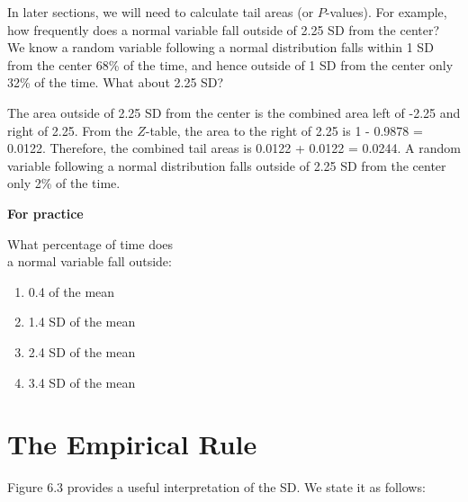 \documentclass[11pt]{book}\usepackage[]{graphicx}\usepackage[]{color}
\begin{document}
In later sections, we will need to calculate tail areas (or $P$-values).  For example, how frequently does a normal variable fall outside of 2.25 SD from the center?  We know a random variable following a normal distribution falls within 1 SD from the center 68\% of the time, and hence outside of 1 SD from the center only 32\% of the time.  What about 2.25 SD?

The area outside of 2.25 SD from the center is the combined area left of -2.25 and right of 2.25.  From the $Z$-table, the area to the right of 2.25 is 1 - 0.9878 = 0.0122.  Therefore, the combined tail areas is 0.0122 + 0.0122 = 0.0244.  A random variable following a normal distribution falls outside of 2.25 SD from the center only 2\% of the time.

\begin{minipage}[ht]{3cm}

\textbf{For practice}
\end{minipage}
\begin{minipage}[ht]{6cm}

\parbox{6cm}{
  What percentage of time does \\ a normal variable fall outside:

  \begin{enumerate}
  \item 0.4 of the mean
  \item 1.4 SD of the mean
  \item 2.4 SD of the mean
  \item 3.4 SD of the mean
  \end{enumerate}
}
\end{minipage}

\section{The Empirical Rule}

Figure 6.3 provides a useful interpretation of the SD.  We state it as follows:

\begin{center}
\end{center}
\end{document}
